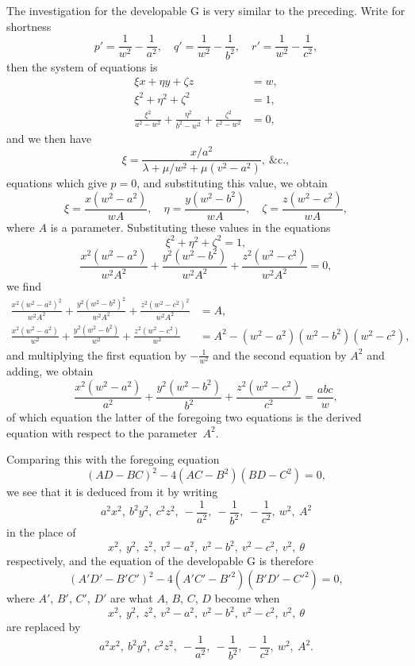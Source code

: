 \documentclass[11pt,a4paper]{book}
\begin{document}
The investigation for the developable G is very similar to the preceding. Write for
shortness
\[
p' = \frac{1}{w^{2}} - \frac{1}{a^{2}},\quad
q' = \frac{1}{w^{2}} - \frac{1}{b^{2}},\quad
r' = \frac{1}{w^{2}} - \frac{1}{c^{2}},
\]
then the system of equations is
\begin{align*}
\xi x + \eta y + \zeta z &= w,\\
\xi^{2} + \eta^{2} + \zeta^{2} &= 1,\\
\frac{\xi^{2}}{a^{2} - w^{2}} + \frac{\eta^{2}}{b^{2} - w^{2}} + \frac{\zeta^{2}}{c^{2} - w^{2}} &= 0,
\end{align*}
and we then have
\[
\xi = \frac{x/a^{2}}{\lambda + \mu/w^{2} + \mu(v^{2} - a^{2})},\ \&\mathrm{c}.,
\]
equations which give $p = 0$, and substituting this value, we obtain
\[
\xi = \frac{x(w^{2} - a^{2})}{wA},\quad
\eta = \frac{y(w^{2} - b^{2})}{wA},\quad
\zeta = \frac{z(w^{2} - c^{2})}{wA},
\]
where $A$ is a parameter. Substituting these values in the equations
\[
\xi^{2} + \eta^{2} + \zeta^{2} = 1,
\]
\[
\frac{x^{2}(w^{2} - a^{2})}{w^{2}A^{2}} + \frac{y^{2}(w^{2} - b^{2})}{w^{2}A^{2}}
+ \frac{z^{2}(w^{2} - c^{2})}{w^{2}A^{2}} = 0,
\]
we find
\begin{align*}
\frac{x^{2}(w^{2} - a^{2})^{2}}{w^{2}A^{2}} + \frac{y^{2}(w^{2} - b^{2})^{2}}{w^{2}A^{2}}
+ \frac{z^{2}(w^{2} - c^{2})^{2}}{w^{2}A^{2}} &= A,\\
\frac{x^{2}(w^{2} - a^{2})}{w^{2}} + \frac{y^{2}(w^{2} - b^{2})}{w^{2}}
+ \frac{z^{2}(w^{2} - c^{2})}{w^{2}} &= A^{2} - (w^{2} - a^{2})(w^{2} - b^{2})(w^{2} - c^{2}),
\end{align*}
and multiplying the first equation by $-\frac{1}{w^{2}}$ and the second equation by $A^{2}$ and adding,
we obtain
\[
\frac{x^{2}(w^{2} - a^{2})}{a^{2}} + \frac{y^{2}(w^{2} - b^{2})}{b^{2}}
+ \frac{z^{2}(w^{2} - c^{2})}{c^{2}} = \frac{abc}{w},
\]
of which equation the latter of the foregoing two equations is the derived equation
with respect to the parameter~$A^{2}$.

Comparing this with the foregoing equation
\[
(AD - BC)^{2} - 4(AC - B^{2})(BD - C^{2}) = 0,
\]
we see that it is deduced from it by writing
\[
a^{2}x^{2},\ b^{2}y^{2},\ c^{2}z^{2},\ -\frac{1}{a^{2}},\ -\frac{1}{b^{2}},\ -\frac{1}{c^{2}},\ w^{2},\ A^{2}
\]
in the place of
\[
x^{2},\ y^{2},\ z^{2},\ v^{2} - a^{2},\ v^{2} - b^{2},\ v^{2} - c^{2},\ v^{2},\ \theta
\]
respectively, and the equation of the developable G is therefore
\[
(A'D' - B'C')^{2} - 4(A'C' - B'^{2})(B'D' - C'^{2}) = 0,
\]
where $A'$, $B'$, $C'$, $D'$ are what $A$, $B$, $C$, $D$ become when
\[
x^{2},\ y^{2},\ z^{2},\ v^{2} - a^{2},\ v^{2} - b^{2},\ v^{2} - c^{2},\ v^{2},\ \theta
\]
are replaced by
\[
a^{2}x^{2},\ b^{2}y^{2},\ c^{2}z^{2},\ -\frac{1}{a^{2}},\ -\frac{1}{b^{2}},\ -\frac{1}{c^{2}},\ w^{2},\ A^{2}.
\]
\end{document}
